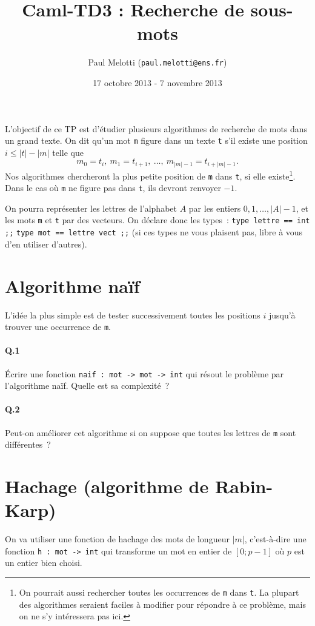 \documentclass[10pt,a4paper]{article}
\begin{document}
\title{Caml-TD3 : Recherche de sous-mots}
\date{17 octobre 2013 - 7 novembre 2013}
\author{Paul Melotti (\texttt{paul.melotti@ens.fr})}
\maketitle{}

L'objectif de ce TP est d'étudier plusieurs algorithmes de recherche de 
mots dans un grand texte. On dit qu'un mot \texttt{m} figure dans un texte 
\texttt{t} s'il existe une position $i\leq |t|-|m|$ telle que
\[m_0 = t_i, \ m_1 = t_{i+1},\  \dots, \ m_{|m|-1} = t_{i+|m|-1}. \]
Nos algorithmes chercheront la plus petite position de \texttt{m} dans
\texttt{t}, si elle existe\footnote{On pourrait aussi rechercher toutes les 
occurrences de \texttt{m} dans \texttt{t}. La plupart des algorithmes seraient
faciles à modifier pour répondre à ce problème, mais on ne s'y intéressera pas
ici.}. Dans le cas où \texttt{m} ne figure pas 
dans \texttt{t}, ils devront renvoyer $-1$.

On pourra représenter les lettres de l'alphabet $A$ par les entiers 
$0, 1, \dots, |A|-1$, et les mots \texttt{m} et \texttt{t} par des vecteurs. On 
déclare donc les types~: \texttt{type lettre == int ;;} 
\texttt{type mot == lettre vect ;;} (si ces types ne vous plaisent pas, libre à 
vous d'en utiliser d'autres).

\section{Algorithme naïf}
L'idée la plus simple est de tester successivement toutes les positions $i$ 
jusqu'à trouver une occurrence de \texttt{m}.
\paragraph{Q.1} Écrire une fonction \texttt{naif : mot -> mot -> int} qui 
résout le problème par l'algorithme naïf. Quelle est sa complexité~?
\paragraph{Q.2} Peut-on améliorer cet algorithme si on suppose que toutes les
lettres de \texttt{m} sont différentes~?
\section{Hachage (algorithme de Rabin-Karp)}
On va utiliser une fonction de hachage des mots de longueur $|m|$, c'est-à-dire 
une fonction \texttt{h : mot -> int} qui transforme un mot en entier de $[0;p-1]$ où 
$p$ est un entier bien choisi.
\end{document}
